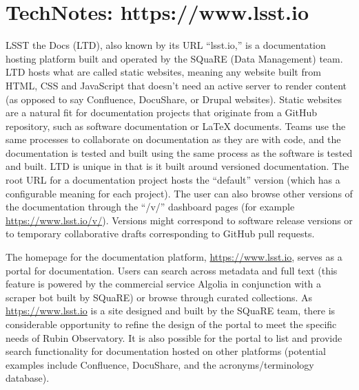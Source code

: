 \section{TechNotes: https://www.lsst.io}

LSST the Docs (LTD), also known by its URL ``lsst.io,'' is a documentation hosting platform built and operated by the SQuaRE (Data Management) team.
LTD hosts what are called static websites, meaning any website built from HTML, CSS and JavaScript that doesn't need an active server to render content (as opposed to say Confluence, DocuShare, or Drupal websites).
Static websites are a natural fit for documentation projects that originate from a GitHub repository, such as software documentation or LaTeX documents.
Teams use the same processes to collaborate on documentation as they are with code, and the documentation is tested and built using the same process as the software is tested and built.
LTD is unique in that is it built around versioned documentation.
The root URL for a documentation project hosts the ``default'' version (which has a configurable meaning for each project).
The user can also browse other versions of the documentation through the ``/v/'' dashboard pages (for example \url{https://www.lsst.io/v/}).
Versions might correspond to software release versions or to temporary collaborative drafts corresponding to GitHub pull requests.

The homepage for the documentation platform, \url{https://www.lsst.io}, serves as a portal for documentation. \citep{lsst.io-cite}
Users can search across metadata and full text (this feature is powered by the commercial service Algolia \citep{Algolia-cite} in conjunction with a scraper bot built by SQuaRE) or browse through curated collections.
As \url{https://www.lsst.io} is a site designed and built by the SQuaRE team, there is considerable opportunity to refine the design of the portal to meet the specific needs of Rubin Observatory.
It is also possible for the portal to list and provide search functionality for documentation hosted on other platforms (potential examples include Confluence, DocuShare, and the acronyms/terminology database).


